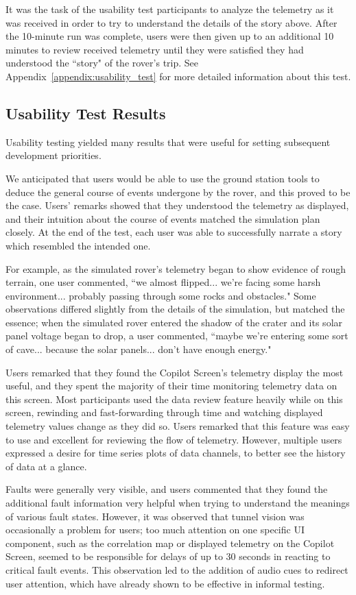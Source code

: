It was the task of the usability test participants to analyze the telemetry as it was received in order to try to understand the details of the story above. After the 10-minute run was complete, users were then given up to an additional 10 minutes to review received telemetry until they were satisfied they had understood the ``story" of the rover's trip. See Appendix~\ref{appendix:usability_test} for more detailed information about this test.

\subsection{Usability Test Results}

Usability testing yielded many results that were useful for setting subsequent development priorities.

We anticipated that users would be able to use the ground station tools to deduce the general course of events undergone by the rover, and this proved to be the case. Users' remarks showed that they understood the telemetry as displayed, and their intuition about the course of events matched the simulation plan closely. At the end of the test, each user was able to successfully narrate a story which resembled the intended one.

For example, as the simulated rover's telemetry began to show evidence of rough terrain, one user commented, ``we almost flipped... we're facing some harsh environment... probably passing through some rocks and obstacles." Some observations differed slightly from the details of the simulation, but matched the essence; when the simulated rover entered the shadow of the crater and its solar panel voltage began to drop, a user commented, ``maybe we're entering some sort of cave... because the solar panels... don't have enough energy."

Users remarked that they found the Copilot Screen's telemetry display the most useful, and they spent the majority of their time monitoring telemetry data on this screen. Most participants used the data review feature heavily while on this screen, rewinding and fast-forwarding through time and watching displayed telemetry values change as they did so. Users remarked that this feature was easy to use and excellent for reviewing the flow of telemetry. However, multiple users expressed a desire for time series plots of data channels, to better see the history of data at a glance.

Faults were generally very visible, and users commented that they found the additional fault information very helpful when trying to understand the meanings of various fault states. However, it was observed that tunnel vision was occasionally a problem for users; too much attention on one specific UI component, such as the correlation map or displayed telemetry on the Copilot Screen, seemed to be responsible for delays of up to 30 seconds in reacting to critical fault events. This observation led to the addition of audio cues to redirect user attention, which have already shown to be effective in informal testing.

